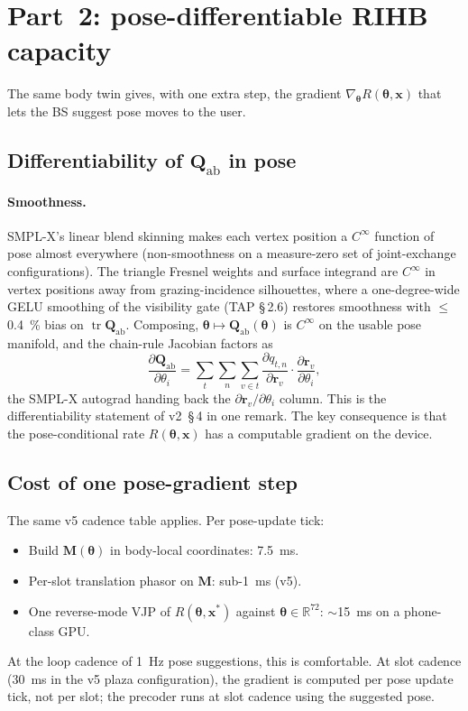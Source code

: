 \documentclass[11pt,a4paper]{article}
\theoremstyle{definition}
\newcommand{\rr}{\mathbf{r}}
\DeclareMathOperator{\tr}{tr}
\newcommand{\Reals}{\mathbb{R}}
\newcommand{\Qabs}{\mathbf{Q}_{\mathrm{ab}}}
\newcommand{\Mmat}{\mathbf{M}}
\newcommand{\xvec}{\mathbf{x}}
\newcommand{\thetab}{\bm{\theta}}
\begin{document}
\section{Part~2: pose-differentiable RIHB capacity}\label{sec:diff}

The same body twin gives, with one extra step, the gradient
$\nabla_\thetab R(\thetab,\xvec)$ that lets the BS suggest pose
moves to the user.

\subsection{Differentiability of $\Qabs$ in pose}

\paragraph{Smoothness.}  SMPL-X's linear blend skinning makes each
vertex position a $C^\infty$ function of pose almost everywhere
(non-smoothness on a measure-zero set of joint-exchange
configurations).  The triangle Fresnel weights and surface integrand
are $C^\infty$ in vertex positions away from grazing-incidence
silhouettes, where a one-degree-wide GELU smoothing of the
visibility gate (TAP \S\,2.6) restores smoothness with $\le$\SI{0.4}{\percent}
bias on $\tr\Qabs$.  Composing,
$\thetab\mapsto\Qabs(\thetab)$ is $C^\infty$ on the usable pose
manifold, and the chain-rule Jacobian factors as
\begin{equation}\label{eq:Q-jac}
  \frac{\partial\Qabs}{\partial\theta_i}
  =\sum_t\sum_n\sum_{v\in t}
    \frac{\partial q_{t,n}}{\partial\rr_v}
    \cdot\frac{\partial\rr_v}{\partial\theta_i},
\end{equation}
the SMPL-X autograd handing back the $\partial\rr_v/\partial\theta_i$
column.  This is the differentiability statement of v2~\S\,4 in one
remark.  The key consequence is that the pose-conditional rate
$R(\thetab,\xvec)$ has a computable gradient on the device.

\subsection{Cost of one pose-gradient step}

The same v5 cadence table applies.  Per pose-update tick:
\begin{itemize}[leftmargin=1.6em,itemsep=2pt]
\item Build $\Mmat(\thetab)$ in body-local coordinates: \SI{7.5}{\ms}.
\item Per-slot translation phasor on $\Mmat$: sub-\SI{1}{\ms} (v5).
\item One reverse-mode VJP of $R(\thetab,\xvec^*)$ against $\thetab\in
  \Reals^{72}$: $\sim$\SI{15}{\ms} on a phone-class GPU.
\end{itemize}
At the loop cadence of \SI{1}{\Hz} pose suggestions, this is
comfortable.  At slot cadence (\SI{30}{\ms} in the v5 plaza
configuration), the gradient is computed per pose update tick, not
per slot; the precoder runs at slot cadence using the suggested
pose.
\end{document}
